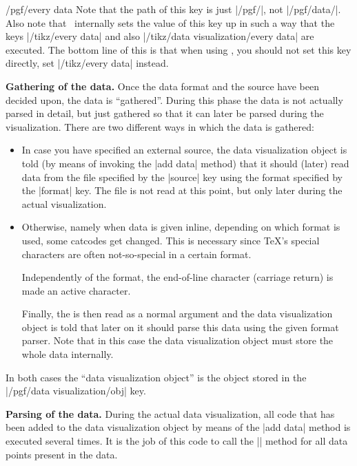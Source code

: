 \begin{command}{\pgfdata{}}
\begin{stylekey}{/pgf/every data}
        Note that the path of this key is just |/pgf/|, not |/pgf/data/|. Also
        note that \tikzname\ internally sets the value of this key up in such a
        way that the keys |/tikz/every data| and also
        |/tikz/data visualization/every data| are executed. The bottom line of
        this is that when using \tikzname, you should not set this key
        directly, set |/tikz/every data| instead.
    \end{stylekey}

    \medskip
    \textbf{Gathering of the data.}
    Once the data format and the source have been decided upon, the data is
    ``gathered''. During this phase the data is not actually parsed in detail,
    but just gathered so that it can later be parsed during the visualization.
    There are two different ways in which the data is gathered:
    \begin{itemize}
        \item In case you have specified an external source, the data
            visualization object is told (by means of invoking the |add data|
            method) that it should (later) read data from  the file specified
            by the |source| key using the format specified by the |format| key.
            The file is not read at this point, but only later during the
            actual visualization.
        \item Otherwise, namely when data is given inline, depending on which
            format is used, some catcodes get changed. This is necessary since
            \TeX's special characters are often not-so-special in a certain
            format.

            Independently of the format, the end-of-line character (carriage
            return) is made an active character.

            Finally, the  is then read as a normal argument
            and the data visualization object is told that later on it should
            parse this data using the given format parser. Note that in this
            case the data visualization object must store the whole data
            internally.
    \end{itemize}
    In both cases the ``data visualization object'' is the object stored
    in the |/pgf/data visualization/obj| key.


    \medskip
    \textbf{Parsing of the data.}
    During the actual data visualization, all code that has been added to the
    data visualization object by means of the |add data| method is executed
    several times. It is the job of this code to call the |\pgfdatapoint|
    method for all data points present in the data.


\end{command}
